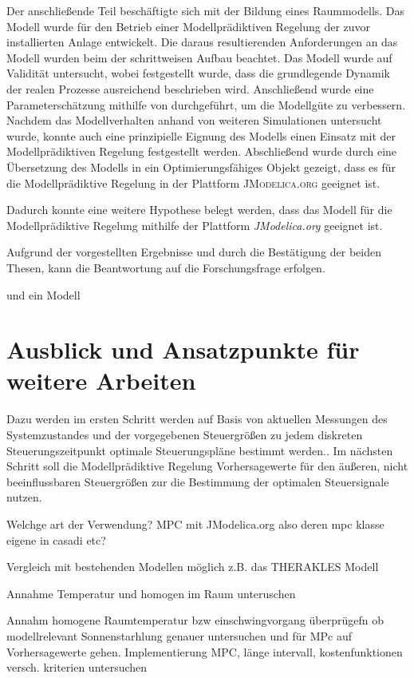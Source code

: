 Der anschließende Teil beschäftigte sich mit der Bildung eines Raummodells. Das Modell wurde für den Betrieb einer Modellprädiktiven Regelung der zuvor installierten Anlage entwickelt. Die daraus resultierenden Anforderungen an das Modell wurden beim der schrittweisen Aufbau beachtet. Das Modell wurde auf Validität untersucht, wobei festgestellt wurde, dass die grundlegende Dynamik der realen Prozesse ausreichend beschrieben wird. Anschließend wurde eine Parameterschätzung mithilfe von \cite{casiopeia} durchgeführt, um die Modellgüte zu verbessern. Nachdem das Modellverhalten anhand von weiteren Simulationen untersucht wurde, konnte auch eine prinzipielle Eignung des Modells einen Einsatz mit der Modellprädiktiven Regelung festgestellt werden. Abschließend wurde durch eine Übersetzung des Modells in ein Optimierungsfähiges Objekt gezeigt, dass es für die Modellprädiktive Regelung in der Plattform \textsc{JModelica.org} geeignet ist.


Dadurch konnte eine weitere Hypothese belegt werden, dass das Modell für die Modellprädiktive Regelung mithilfe der Plattform \textit{JModelica.org} geeignet ist.

Aufgrund der vorgestellten Ergebnisse und durch die Bestätigung der beiden Thesen, kann die Beantwortung auf die Forschungsfrage erfolgen. 

 und ein Modell

\section{Ausblick und Ansatzpunkte für weitere Arbeiten}
\label{sec:ausblick}

Dazu werden im ersten Schritt werden auf Basis von aktuellen Messungen des Systemzustandes und der vorgegebenen Steuergrößen zu jedem diskreten Steuerungszeitpunkt optimale Steuerungspläne bestimmt werden..
Im nächsten Schritt soll die Modellprädiktive Regelung Vorhersagewerte für den äußeren, nicht beeinflussbaren Steuergrößen zur die Bestimmung der optimalen Steuersignale nutzen.

Welchge art der Verwendung?
MPC mit JModelica.org also deren mpc klasse
eigene in casadi
etc?

Vergleich mit bestehenden Modellen möglich z.B. das THERAKLES Modell

Annahme Temperatur und homogen im Raum unteruschen

Annahm homogene Raumtemperatur bzw einschwingvorgang überprügefn ob modellrelevant
Sonnenstarhlung genauer untersuchen und für MPc auf Vorhersagewerte gehen.
Implementierung MPC, länge intervall, kostenfunktionen versch. kriterien untersuchen